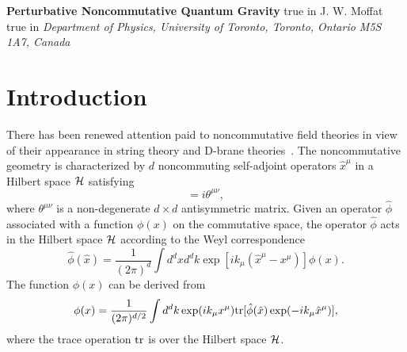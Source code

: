 \documentclass[a4paper,10pt]{article}
\begin{document}
\pagestyle{plain}
\setcounter{page}{1}
\begin{center}
{\large\bf Perturbative Noncommutative Quantum Gravity}
 true in
{\large J. W. Moffat}
 true in
{\it Department of Physics, University of Toronto,
Toronto, Ontario M5S 1A7, Canada}
\end{center}
\begin{abstract}%
We study perturbative noncommutative quantum gravity by expanding the
gravitational field about a fixed classical background. A calculation of
the one loop gravitational self-energy graph reveals that only the
non-planar graviton loops are damped by oscillating internal momentum
dependent factors. The noncommutative quantum gravity perturbation theory
is not renormalizable beyond one loop for matter-free gravity and all loops
for matter interactions. Comments are made about the nonlocal gravitational
interactions produced by the noncommutative spacetime geometry.
\end{abstract}



\section{Introduction}

There has been renewed attention paid to noncommutative field theories in
view of their appearance in string theory and D-brane
theories~\cite{Connes,Witten,Douglas}. The noncommutative
geometry is characterized by $d$ noncommuting self-adjoint
operators ${\hat x}^\mu$ in a Hilbert space ${\cal H}$ satisfying
\begin{equation}
[{\hat x}^\mu,{\hat x}^\nu]=i\theta^{\mu\nu},
\end{equation}
where $\theta^{\mu\nu}$ is a non-degenerate $d\times d$ antisymmetric
matrix. Given an operator ${\hat\phi}$ associated with a
function $\phi(x)$ on the commutative space, the operator ${\hat\phi}$ acts
in the Hilbert space ${\cal H}$ according to the Weyl correspondence
\begin{equation}
{\hat\phi}({\hat x})=\frac{1}{(2\pi)^d}\int d^dxd^dk
\exp[ik_\mu({\hat x}^\mu-x^\mu)]\phi(x).
\end{equation}
The function $\phi(x)$ can be derived from
\begin{equation}
\phi(x)=\frac{1}{(2\pi)^{d/2}}\int d^dk\exp(ik_\mu x^\mu)
{\rm tr}[{\hat\phi}({\hat x})\exp(-ik_\mu{\hat x}^\mu)],
\end{equation}
where the trace operation ${\rm tr}$ is over the Hilbert space ${\cal H}$.
\end{document}
